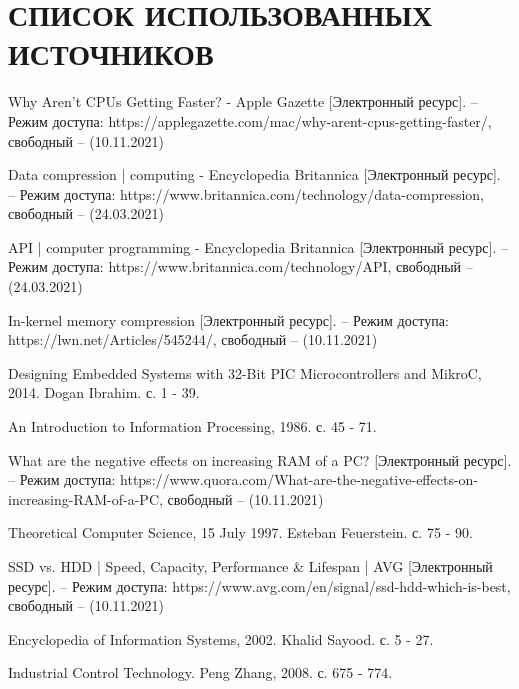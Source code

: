 \section*{СПИСОК ИСПОЛЬЗОВАННЫХ ИСТОЧНИКОВ}

\begingroup
\renewcommand{\section}[2]{}
\begin{thebibliography}{}
	Why Aren’t CPUs Getting Faster? - Apple Gazette [Электронный ресурс]. – Режим доступа: https://applegazette.com/mac/why-arent-cpus-getting-faster/,
	свободный – (10.11.2021)
	
	Data compression | computing - Encyclopedia Britannica [Электронный ресурс]. – Режим доступа: https://www.britannica.com/technology/data-compression, свободный – (24.03.2021)
	
	API | computer programming - Encyclopedia Britannica [Электронный ресурс]. – Режим доступа: https://www.britannica.com/technology/API, свободный – (24.03.2021)
	
	In-kernel memory compression [Электронный ресурс]. – Режим доступа: https://lwn.net/Articles/545244/, свободный – (10.11.2021)
	
	Designing Embedded Systems with 32-Bit PIC Microcontrollers and MikroC, 2014. Dogan Ibrahim. с. 1 - 39.
	
	An Introduction to Information Processing, 1986. с. 45 - 71.
	
	What are the negative effects on increasing RAM of a PC? [Электронный ресурс]. – Режим доступа: https://www.quora.com/What-are-the-negative-effects-on-increasing-RAM-of-a-PC, свободный – (10.11.2021)
	
	Theoretical Computer Science, 15 July 1997. Esteban Feuerstein. с. 75 - 90.
	
	SSD vs. HDD | Speed, Capacity, Performance \& Lifespan | AVG [Электронный ресурс]. – Режим доступа: https://www.avg.com/en/signal/ssd-hdd-which-is-best, свободный – (10.11.2021)
	
	Encyclopedia of Information Systems, 2002. Khalid Sayood. с. 5 - 27.
	
	Industrial Control Technology. Peng Zhang, 2008. с. 675 - 774.
	

\end{thebibliography}

